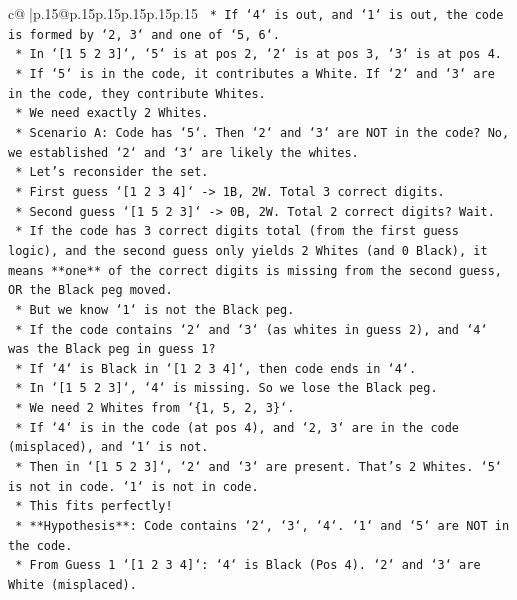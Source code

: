 \documentclass{article}
\begin{document}
{\begin{supertabular}{c@{$\;$}|p{.15\linewidth}@{}p{.15\linewidth}p{.15\linewidth}p{.15\linewidth}p{.15\linewidth}p{.15\linewidth}}
{{{\texttt{        *   If `4` is out, and `1` is out, the code is formed by `2, 3` and one of `5, 6`.} \\
\texttt{        *   In `{[}1 5 2 3{]}`, `5` is at pos 2, `2` is at pos 3, `3` is at pos 4.} \\
\texttt{        *   If `5` is in the code, it contributes a White. If `2` and `3` are in the code, they contribute Whites.} \\
\texttt{        *   We need exactly 2 Whites.} \\
\texttt{        *   Scenario A: Code has `5`. Then `2` and `3` are NOT in the code? No, we established `2` and `3` are likely the whites.} \\
\texttt{        *   Let's reconsider the set.} \\
\texttt{        *   First guess `{[}1 2 3 4{]}` {-}> 1B, 2W. Total 3 correct digits.} \\
\texttt{        *   Second guess `{[}1 5 2 3{]}` {-}> 0B, 2W. Total 2 correct digits? Wait.} \\
\texttt{        *   If the code has 3 correct digits total (from the first guess logic), and the second guess only yields 2 Whites (and 0 Black), it means **one** of the correct digits is missing from the second guess, OR the Black peg moved.} \\
\texttt{        *   But we know `1` is not the Black peg.} \\
\texttt{        *   If the code contains `2` and `3` (as whites in guess 2), and `4` was the Black peg in guess 1?} \\
\texttt{            *   If `4` is Black in `{[}1 2 3 4{]}`, then code ends in `4`.} \\
\texttt{            *   In `{[}1 5 2 3{]}`, `4` is missing. So we lose the Black peg.} \\
\texttt{            *   We need 2 Whites from `\{1, 5, 2, 3\}`.} \\
\texttt{            *   If `4` is in the code (at pos 4), and `2, 3` are in the code (misplaced), and `1` is not.} \\
\texttt{            *   Then in `{[}1 5 2 3{]}`, `2` and `3` are present. That's 2 Whites. `5` is not in code. `1` is not in code.} \\
\texttt{            *   This fits perfectly!} \\
\texttt{            *   **Hypothesis**: Code contains `2`, `3`, `4`. `1` and `5` are NOT in the code.} \\
\texttt{            *   From Guess 1 `{[}1 2 3 4{]}`: `4` is Black (Pos 4). `2` and `3` are White (misplaced).} \\
}}}
\end{supertabular}}
\end{document}
